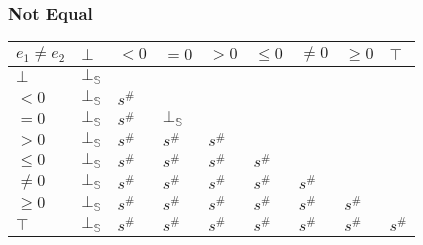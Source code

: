 \documentclass[aspectratio=169]{beamer}
\begin{document}
\begin{frame}
    \frametitle{Not Equal}
\begin{table}
    \begin{tabular}{|l|l|l|l|l|l|l|l|l|}
    \hline
    $e_1 \ne e_2$ & $\bot$ & $<0$   & $=0$   & $>0$   & $\le 0$ & $\ne 0$ & $\ge 0$ & $\top$ \\ \hline
    $\bot$        & $\bot_\mathbb{S}$ &        &        &        &         &         &         &        \\ \hline
    $<0$          & $\bot_\mathbb{S}$ & $s^\#$ &        &        &         &         &         &        \\ \hline
    $=0$          & $\bot_\mathbb{S}$ & $s^\#$ & $\bot_\mathbb{S}$ &        &         &         &         &        \\ \hline
    $>0$          & $\bot_\mathbb{S}$ & $s^\#$ & $s^\#$ & $s^\#$ &         &         &         &        \\ \hline
    $\le 0$       & $\bot_\mathbb{S}$ & $s^\#$ & $s^\#$ & $s^\#$ & $s^\#$  &         &         &        \\ \hline
    $\ne 0$       & $\bot_\mathbb{S}$ & $s^\#$ & $s^\#$ & $s^\#$ & $s^\#$  & $s^\#$  &         &        \\ \hline
    $\ge 0$       & $\bot_\mathbb{S}$ & $s^\#$ & $s^\#$ & $s^\#$ & $s^\#$  & $s^\#$  & $s^\#$  &        \\ \hline
    $\top$        & $\bot_\mathbb{S}$ & $s^\#$ & $s^\#$ & $s^\#$ & $s^\#$  & $s^\#$  & $s^\#$  & $s^\#$ \\ \hline
    \end{tabular}
    \end{table}
\end{frame}
\end{document}
